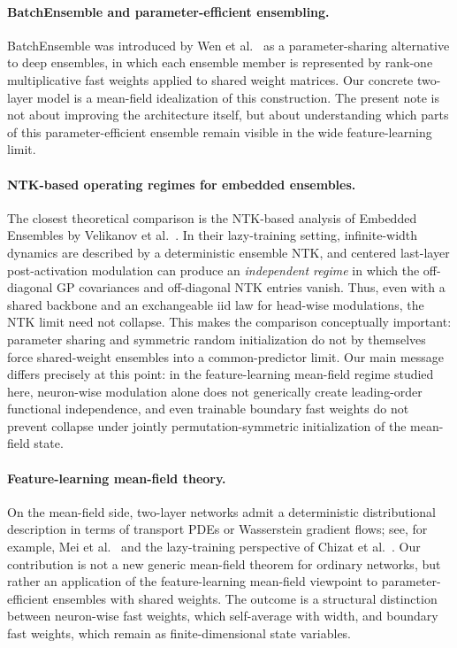 \documentclass[11pt]{article}
\theoremstyle{definition}
\begin{document}
\paragraph{BatchEnsemble and parameter-efficient ensembling.}
BatchEnsemble was introduced by Wen et al.\ \cite{wen2020} as a
parameter-sharing alternative to deep ensembles, in which each ensemble member
is represented by rank-one multiplicative fast weights applied to shared weight
matrices. Our concrete two-layer model is a mean-field idealization of this
construction. The present note is not about improving the architecture itself,
but about understanding which parts of this parameter-efficient ensemble remain
visible in the wide feature-learning limit.

\paragraph{NTK-based operating regimes for embedded ensembles.}
The closest theoretical comparison is the NTK-based analysis of Embedded
Ensembles by Velikanov et al.\ \cite{velikanov2022}. In their lazy-training
setting, infinite-width dynamics are described by a deterministic ensemble NTK,
and centered last-layer post-activation modulation can produce an
\emph{independent regime} in which the off-diagonal GP covariances and
off-diagonal NTK entries vanish. Thus, even with a shared backbone and an
exchangeable iid law for head-wise modulations, the NTK limit need not
collapse. This makes the comparison conceptually important: parameter sharing
and symmetric random initialization do not by themselves force shared-weight
ensembles into a common-predictor limit. Our main message differs precisely at
this point: in the feature-learning mean-field regime studied here, neuron-wise
modulation alone does not generically create leading-order functional
independence, and even trainable boundary fast weights do not prevent collapse
under jointly permutation-symmetric initialization of the mean-field state.

\paragraph{Feature-learning mean-field theory.}
On the mean-field side, two-layer networks admit a deterministic
distributional description in terms of transport PDEs or Wasserstein gradient
flows; see, for example, Mei et al.\ \cite{mei2018} and the lazy-training
perspective of Chizat et al.\ \cite{chizat2019}. Our contribution is not a new
generic mean-field theorem for ordinary networks, but rather an application of
the feature-learning mean-field viewpoint to parameter-efficient ensembles with
shared weights. The outcome is a structural distinction between neuron-wise
fast weights, which self-average with width, and boundary fast weights, which
remain as finite-dimensional state variables.
\end{document}
